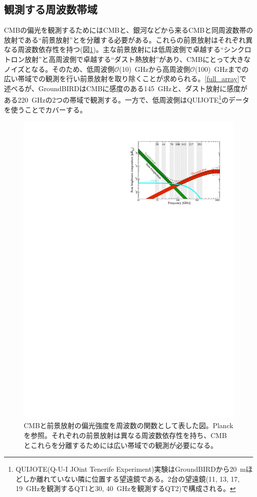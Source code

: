 \subsection{観測する周波数帯域}
CMBの偏光を観測するためにはCMBと、銀河などから来るCMBと同周波数帯の放射である``前景放射''とを分離する必要がある。これらの前景放射はそれぞれ異なる周波数依存性を持つ(図\ref{planck_spectrum})。主な前景放射には低周波側で卓越する``シンクロトロン放射''と高周波側で卓越する``ダスト熱放射''があり、CMBにとって大きなノイズとなる。そのため、低周波側$\mathcal{O}$(10)~GHzから高周波側$\mathcal{O}$(100)~GHzまでの広い帯域での観測を行い前景放射を取り除くことが求められる。\ref{full_array}で述べるが、GroundBIRDはCMBに感度のある\SI{145}{GHz}と、ダスト放射に感度がある\SI{220}{GHz}の2つの帯域で観測する。一方で、低周波側はQUIJOTE\footnote{QUIJOTE(Q-U-I JOint Tenerife Experiment)実験はGroundBIRDから\SI{20}{m}ほどしか離れていない隣に位置する望遠鏡である。2台の望遠鏡(11, 13, 17, \SI{19}{GHz}を観測するQT1と30, \SI{40}{GHz}を観測するQT2)で構成される。}のデータを使うことでカバーする。
\begin{figure}[htbp]
  \centering
  \includegraphics[width=0.8\columnwidth]{3_GB/figs/planck_spectrum.pdf}
  \caption{CMBと前景放射の偏光強度を周波数の関数として表した図。Planck\cite{planck_cmb}を参照。それぞれの前景放射は異なる周波数依存性を持ち、CMBとこれらを分離するためには広い帯域での観測が必要になる。}
  \label{planck_spectrum}
\end{figure}

